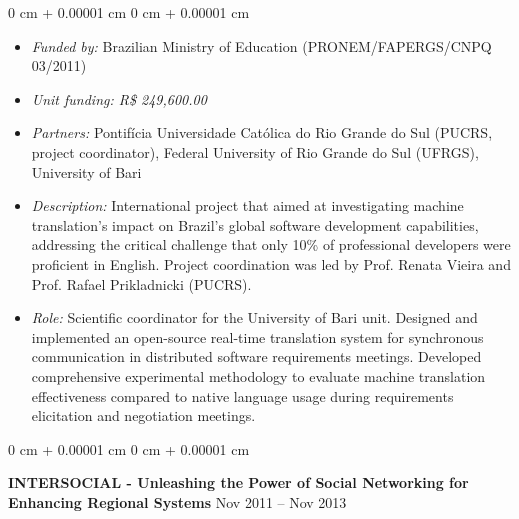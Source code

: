 \documentclass[10pt, a4paper]{article}
\newenvironment{highlights}{
    \begin{itemize}[
        topsep=0.10 cm,
        parsep=0.10 cm,
        partopsep=0pt,
        itemsep=0pt,
        leftmargin=0 cm + 10pt
    ]
}{
    \end{itemize}
} %
\newenvironment{onecolentry}{
    \begin{adjustwidth}{
        0 cm + 0.00001 cm
    }{
        0 cm + 0.00001 cm
    }
}{
    \end{adjustwidth}
} %
\newenvironment{twocolentry}[2][]{
    \onecolentry
    \def\secondColumn{#2}
    \setcolumnwidth{\fill, 4.5 cm}
    \begin{paracol}{2}
}{
    \switchcolumn \raggedleft \secondColumn
    \end{paracol}
    \endonecolentry
} %
\begin{document}
        \vspace{0.10 cm}
        \begin{onecolentry}
            \begin{highlights}
                \item \textit{Funded by:} Brazilian Ministry of Education (PRONEM/FAPERGS/CNPQ 03/2011)
                \item \textit{Unit funding: R\$ 249,600.00}
                \item \textit{Partners:} Pontifícia Universidade Católica do Rio Grande do Sul (PUCRS, project coordinator), Federal University of Rio Grande do Sul (UFRGS), University of Bari
                \item \textit{Description:} International project that aimed at investigating machine translation's impact on Brazil's global software development capabilities, addressing the critical challenge that only 10\% of professional developers were proficient in English. Project coordination was led by Prof. Renata Vieira and Prof. Rafael Prikladnicki (PUCRS).
                \item \textit{Role:} Scientific coordinator for the University of Bari unit. Designed and implemented an open-source real-time translation system for synchronous communication in distributed software requirements meetings. Developed comprehensive experimental methodology to evaluate machine translation effectiveness compared to native language usage during requirements elicitation and negotiation meetings.
            \end{highlights}
        \end{onecolentry}


        \vspace{0.2 cm}

        \begin{twocolentry}{
            Nov 2011 – Nov 2013
        }
            \textbf{INTERSOCIAL - Unleashing the Power of Social Networking for Enhancing Regional Systems}\end{twocolentry}
\end{document}
